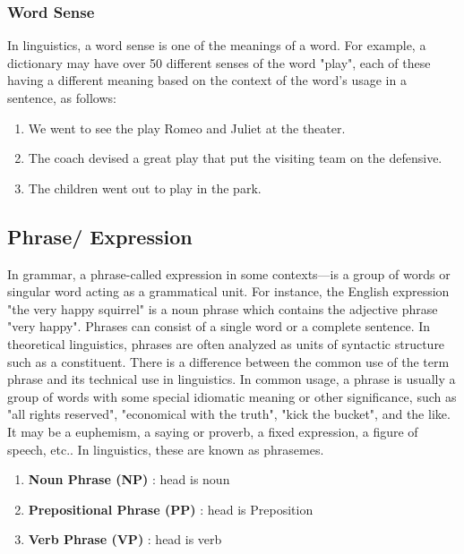 \subsubsection{Word Sense \cite{wiki-word-sense}}\label{word-sense}
In linguistics, a word sense is one of the meanings of a word. For example, a dictionary may have over 50 different senses of the word "play", each of these having a different meaning based on the context of the word's usage in a sentence, as follows:

\begin{enumerate}
    \item We went to see the play Romeo and Juliet at the theater.
    \item The coach devised a great play that put the visiting team on the defensive.
    \item The children went out to play in the park.
\end{enumerate}




\subsection{Phrase/ Expression \cite{wiki-phrase}}\label{Language: Phrase/ Expression}
In grammar, a phrase-called expression in some contexts—is a group of words or singular word acting as a grammatical unit. For instance, the English expression "the very happy squirrel" is a noun phrase which contains the adjective phrase "very happy". Phrases can consist of a single word or a complete sentence. In theoretical linguistics, phrases are often analyzed as units of syntactic structure such as a constituent. There is a difference between the common use of the term phrase and its technical use in linguistics. In common usage, a phrase is usually a group of words with some special idiomatic meaning or other significance, such as "all rights reserved", "economical with the truth", "kick the bucket", and the like. It may be a euphemism, a saying or proverb, a fixed expression, a figure of speech, etc.. In linguistics, these are known as phrasemes.

\begin{enumerate}
    \item \textbf{Noun Phrase (NP)} : head is noun
    \item \textbf{Prepositional Phrase (PP)} : head is Preposition
    \item \textbf{Verb Phrase (VP)} : head is verb
\end{enumerate}

